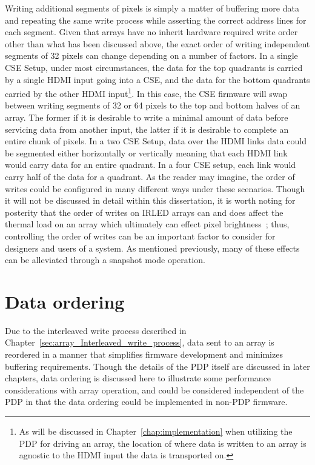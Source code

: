     Writing additional segments of pixels is simply a matter of buffering more data and repeating the same write process while asserting the correct address lines for each segment. Given that arrays have no inherit hardware required write order other than what has been discussed above, the exact order of writing independent segments of 32 pixels can change depending on a number of factors. In a single CSE Setup, under most circumstances, the data for the top quadrants is carried by a single HDMI input going into a CSE, and the data for the bottom quadrants carried by the other HDMI input\footnote{As will be discussed in Chapter~\ref{chap:implementation} when utilizing the PDP for driving an array, the location of where data is written to an array is agnostic to the HDMI input the data is transported on.}. In this case, the CSE firmware will swap between writing segments of 32 or 64 pixels to the top and bottom halves of an array. The former if it is desirable to write a minimal amount of data before servicing data from another input, the latter if it is desirable to complete an entire chunk of pixels. In a two CSE Setup, data over the HDMI links data could be segmented either horizontally or vertically meaning that each HDMI link would carry data for an entire quadrant. In a four CSE setup, each link would carry half of the data for a quadrant. As the reader may imagine, the order of writes could be configured in many different ways under these scenarios. Though it will not be discussed in detail within this dissertation, it is worth noting for posterity that the order of writes on IRLED arrays can and does affect the thermal load on an array which ultimately can effect pixel brightness~\cite{BarakhshanEtAl2017, LaVeigneSieglinger2012, Norton2013}; thus, controlling the order of writes can be an important factor to consider for designers and users of a system. As mentioned previously, many of these effects can be alleviated through a snapshot mode operation.

\section{Data ordering}
    Due to the interleaved write process described in Chapter~\ref{sec:array_Interleaved_write_process}, data sent to an array is reordered in a manner that simplifies firmware development and minimizes buffering requirements. Though the details of the PDP itself are discussed in later chapters, data ordering is discussed here to illustrate some performance considerations with array operation, and could be considered independent of the PDP in that the data ordering could be implemented in non-PDP firmware.

